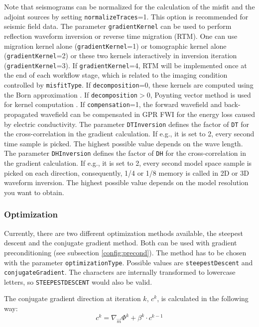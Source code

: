 \documentclass[pdftex,a4paper,parskip,listof=totoc,bibliography=totoc,onehalfspacing,12pt]{scrreprt}
\begin{document}
Note that seismograms can be normalized for the calculation of the misfit and the adjoint sources by setting \verb+normalizeTraces+=1. This option is recommended for seismic field data. The parameter \verb+gradientKernel+ can be used to perform reflection waveform inversion \citep{xu2012inversion} or reverse time migration (RTM). One can use migration kernel alone (\verb+gradientKernel+=1) or tomographic kernel alone (\verb+gradientKernel+=2) or these two kernels interactively in inversion iteration (\verb+gradientKernel+=3). If \verb+gradientKernel+=4, RTM will be implemented once at the end of each workflow stage, which is related to the imaging condition controlled by \verb+misfitType+. If \verb+decomposition+=0, these kernels are computed using the Born approximation \citep{yao2017reflection}. If \verb+decomposition+$>$0, Poynting vector method is used for kernel computation \citep{tang2013tomographically}. If \verb+compensation+=1, the forward wavefield and back-propagated wavefield can be compensated in GPR FWI for the energy loss caused by electric conductivity.
The parameter \verb+DTInversion+ defines the factor of \verb+DT+ for the cross-correlation in the gradient calculation. If e.g., it is set to 2, every second time sample is picked. The highest possible value depends on the wave length.
The parameter \verb+DHInversion+ defines the factor of \verb+DH+ for the cross-correlation in the gradient calculation. If e.g., it is set to 2, every second model space sample is picked on each direction, consequently, 1/4 or 1/8 memory is called in 2D or 3D waveform inversion. The highest possible value depends on the model resolution you want to obtain.

\subsubsection{Optimization}
Currently, there are two different optimization methods available, the steepest descent and the conjugate gradient method. Both can be used with gradient preconditioning (see subsection \ref{config:precond}). The method has to be chosen with the parameter \verb+optimizationType+. Possible values are \verb+steepestDescent+ and \verb+conjugateGradient+. The characters are internally transformed to lowercase letters, so \verb+STEEPESTDESCENT+ would also be valid.

The conjugate gradient direction at iteration $k$, $c^k$, is calculated in the following way:
\begin{equation*}
 c^k =  \nabla_{\vec{m}} \Phi^k + \beta^k \cdot c^{k-1}
\end{equation*}
\end{document}
